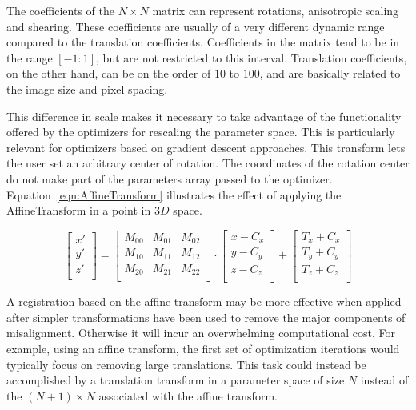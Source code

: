 The coefficients of the $N \times N$ matrix can represent rotations,
anisotropic scaling and shearing. These coefficients are usually of a very
different dynamic range compared to the translation
coefficients. Coefficients in the matrix tend to be in the range $[-1:1]$, but
are not restricted to this interval.  Translation coefficients, on the other
hand, can be on the order of $10$ to $100$, and are basically related to the
image size and pixel spacing.

This difference in scale makes it necessary to take advantage of the
functionality offered by the optimizers for rescaling the parameter space. This
is particularly relevant for optimizers based on gradient descent approaches.
This transform lets the user set an arbitrary center of rotation. The
coordinates of the rotation center do not make part of the parameters array
passed to the optimizer. Equation~\ref{eqn:AffineTransform} illustrates the
effect of applying the AffineTransform in a point in $3D$ space.

\begin{equation}
\label{eqn:AffineTransform}
\left[ 
\begin{array}{c}
x' \\
y' \\
z' \\
\end{array}
\right]
=
\left[ 
\begin{array}{ccc}
M_{00} & M_{01} & M_{02} \\
M_{10} & M_{11} & M_{12} \\
M_{20} & M_{21} & M_{22} \\
\end{array}
\right]
\cdot
\left[ 
\begin{array}{c}
x - C_x \\
y - C_y \\
z - C_z \\
\end{array}
\right]
+ 
\left[ 
\begin{array}{c}
T_x + C_x \\
T_y + C_y \\
T_z + C_z \\
\end{array}
\right]
\end{equation}


A registration based on the affine transform may be more effective when
applied after simpler transformations have been used to remove the major
components of misalignment. Otherwise it will incur an overwhelming
computational cost. For example, using an affine transform, the first set of
optimization iterations would typically focus on removing large
translations. This task could instead be accomplished by a translation
transform in a parameter space of size $N$ instead of the $(N+1) \times N$
associated with the affine transform.

